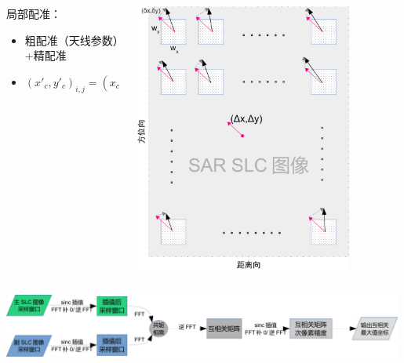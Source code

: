 \documentclass{beamer}
\begin{document}
\begin{frame}
\begin{columns}
\begin{column}{0.5\textwidth}
            局部配准：
            \begin{itemize}
                \item 粗配准（天线参数）+精配准\\
                \item \tiny $ (x'_c, y'_c)_{i,j} = (x_c, y_c)_{i,j} + (\Delta_x, \Delta_y) + (\delta_x, \delta_y)_{i,j} $
            \end{itemize}
        \end{column}
        \begin{column}{0.5\textwidth}
            \includegraphics[width=0.80\textwidth]{figures/register.pdf}
        \end{column}
    \end{columns}

    \centering
    \includegraphics[width=0.99\textwidth]{figures/xcorr-crop.pdf}
\end{frame}
\end{document}
